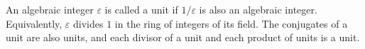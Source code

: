 An algebraic integer $\varepsilon$ is called a unit if $1/\varepsilon$ is also an algebraic integer. Equivalently, $\varepsilon$ divides $1$ in the ring of integers of its field. The conjugates of a unit are also units, and each divisor of a unit and each product of units is a unit.
